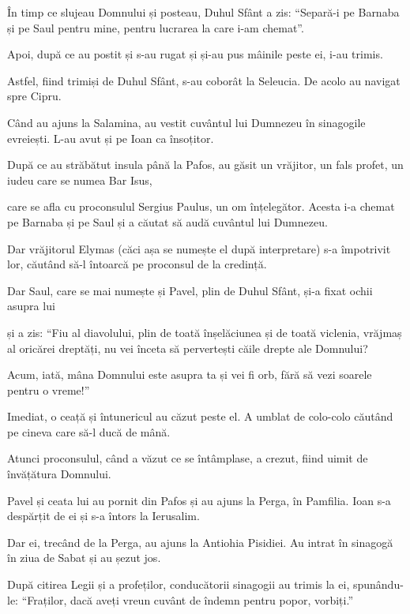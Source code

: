 {În timp ce slujeau Domnului și posteau, Duhul Sfânt a zis: “Separă-i pe Barnaba și pe Saul pentru mine, pentru lucrarea la care i-am chemat”.


\par }{\PP {}Apoi, după ce au postit și s-au rugat și și-au pus mâinile peste ei, i-au trimis.

Astfel, fiind trimiși de Duhul Sfânt, s-au coborât la Seleucia. De acolo au navigat spre Cipru.

Când au ajuns la Salamina, au vestit cuvântul lui Dumnezeu în sinagogile evreiești. L-au avut și pe Ioan ca însoțitor.

După ce au străbătut insula până la Pafos, au găsit un vrăjitor, un fals profet, un iudeu care se numea Bar Isus,

care se afla cu proconsulul Sergius Paulus, un om înțelegător. Acesta i-a chemat pe Barnaba și pe Saul și a căutat să audă cuvântul lui Dumnezeu.

Dar vrăjitorul Elymas (căci așa se numește el după interpretare) s-a împotrivit lor, căutând să-l întoarcă pe proconsul de la credință.

Dar Saul, care se mai numește și Pavel, plin de Duhul Sfânt, și-a fixat ochii asupra lui

și a zis: “Fiu al diavolului, plin de toată înșelăciunea și de toată viclenia, vrăjmaș al oricărei dreptăți, nu vei înceta să pervertești căile drepte ale Domnului?

Acum, iată, mâna Domnului este asupra ta și vei fi orb, fără să vezi soarele pentru o vreme!”

\par }{\PP Imediat, o ceață și întunericul au căzut peste el. A umblat de colo-colo căutând pe cineva care să-l ducă de mână.

Atunci proconsulul, când a văzut ce se întâmplase, a crezut, fiind uimit de învățătura Domnului.


\par }{\PP {}Pavel și ceata lui au pornit din Pafos și au ajuns la Perga, în Pamfilia. Ioan s-a despărțit de ei și s-a întors la Ierusalim.

Dar ei, trecând de la Perga, au ajuns la Antiohia Pisidiei. Au intrat în sinagogă în ziua de Sabat și au șezut jos.

După citirea Legii și a profeților, conducătorii sinagogii au trimis la ei, spunându-le: “Fraților, dacă aveți vreun cuvânt de îndemn pentru popor, vorbiți.”


}
